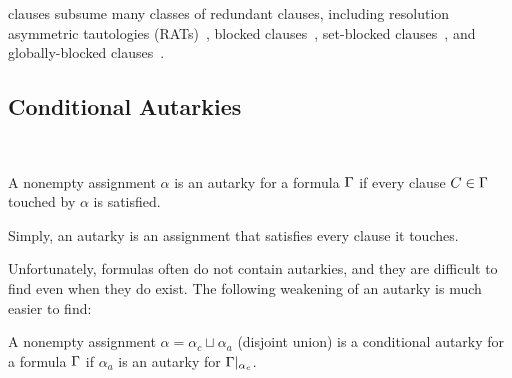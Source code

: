 





\pr clauses subsume many classes of redundant clauses, including resolution
asymmetric tautologies (RATs)~\cite{rat}, blocked clauses~\cite{blockedclause},
set-blocked clauses~\cite{setblocked}, and globally-blocked
clauses~\cite{conditionalautarkies}.

\subsection{Conditional Autarkies}~\label{subsec:autarkies}


\begin{definition}
    A nonempty assignment $\alpha$ is an autarky for a formula $\Gamma$ if
    every clause $C \in \Gamma$ touched by $\alpha$ is satisfied.
\end{definition}


Simply, an autarky is an assignment that satisfies every clause it
touches.

Unfortunately, formulas often do not contain autarkies, and they are difficult
to find even when they do exist. The following weakening of an autarky is much
easier to find: 

\begin{definition}
    A nonempty assignment $\alpha = \alpha_c \sqcup \alpha_a$ (disjoint union)
    is a conditional autarky for a formula $\Gamma$ if $\alpha_a$ is an
    autarky for $\Gamma|_{\alpha_c}$.
\end{definition}

